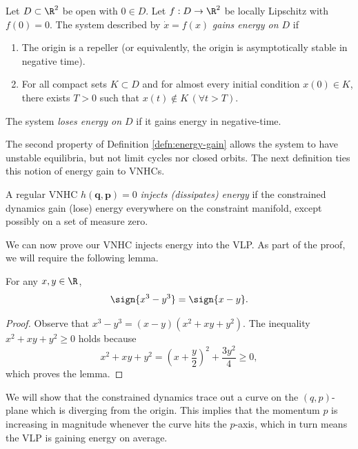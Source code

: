 \begin{defn}\label{defn:energy-gain}
   Let \(D \subset \R^2\) be open with \(0 \in D\).
   Let \(f : D \rightarrow \R^2\) be locally Lipschitz with \(f(0) = 0\).
   The system described by \(\dot{x} = f(x)\) 
   \textit{gains energy on \(D\)} if 
   \begin{enumerate}
      \item The origin is a repeller 
         (or equivalently, the origin is asymptotically stable in negative time).
      \item For all compact sets \(K \subset D\) and for almost every initial
         condition \(x(0) \in K\), there exists \(T > 0\) such
         that \(x(t) \not \in K \, (\forall t > T)\).
   \end{enumerate}
   The system \textit{loses energy on \(D\)} if it gains energy in
   negative-time.
\end{defn}

The second property of Definition \ref{defn:energy-gain} allows the system
to have unstable equilibria, but not limit cycles nor closed orbits.
The next definition ties this notion of energy gain to VNHCs.

\begin{defn}\label{defn:energy-injection}
   A regular VNHC \(h(\mathbf{q},\mathbf{p}) = 0\) 
   \textit{injects (dissipates) energy} if the constrained dynamics gain (lose)
   energy everywhere on the constraint manifold, except possibly on a set of
   measure zero.
\end{defn}

We can now prove our VNHC injects energy into the VLP. 
As part of the proof, we will require the following lemma.

\begin{lemma}\label{lemma:sign-of-cube}
   For any \(x,y \in \R\),
   \[
      \sign{x^3 - y^3} = \sign{x-y}
      .
   \]
\end{lemma}
\begin{proof}
   Observe that \(x^3 - y^3 =  (x-y)(x^2 + xy + y^2)\).
   The inequality \(x^2 + xy + y^2 \geq 0\) holds because
   \[
      x^2 + xy + y^2 = \left(x  + \frac{y}{2}\right)^2 + \frac{3y^2}{4} \geq 0
      ,
   \]
   which proves the lemma.
\end{proof}

We will show that the constrained dynamics trace out a curve on the
\((q,p)\)-plane which is diverging from the origin.  
This implies that the momentum \(p\) is increasing in magnitude whenever the
curve hits the \(p\)-axis, which in turn means the VLP is gaining energy on
average.

